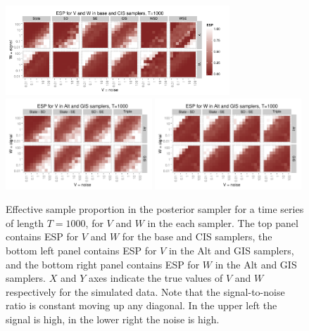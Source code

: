\documentclass{article}
\begin{document}
\begin{figure}[!h]
\centering
\includegraphics[width=0.75\textwidth]{basecisESplot1000}
\includegraphics[width=0.49\textwidth]{altintESplotV1000}
\includegraphics[width=0.49\textwidth]{altintESplotW1000}
\caption{Effective sample proportion in the posterior sampler for a time series of length $T=1000$, for $V$ and $W$ in the each sampler. The top panel contains ESP for $V$ and $W$ for the base and CIS samplers, the bottom left panel contains ESP for $V$ in the Alt and GIS samplers, and the bottom right panel contains ESP for $W$ in the Alt and GIS samplers. $X$ and $Y$ axes indicate the true values of $V$ and $W$ respectively for the simulated data. Note that the signal-to-noise ratio is constant moving up any diagonal. In the upper left the signal is high, in the lower right the noise is high.}
\label{ESplot3}
\end{figure}
\end{document}
